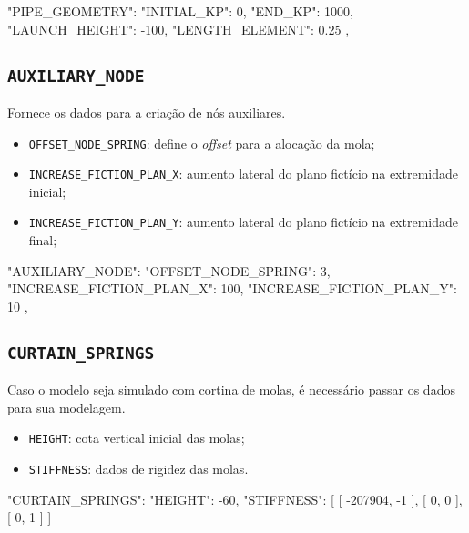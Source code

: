 \begin{jsoncode}
{
  "PIPE_GEOMETRY": {
    "INITIAL_KP": 0,
    "END_KP": 1000,
    "LAUNCH_HEIGHT": -100,
    "LENGTH_ELEMENT": 0.25
  },
}
\end{jsoncode}

\subsection{\texttt{AUXILIARY\_NODE}}

Fornece os dados para a criação de nós auxiliares.

\begin{itemize}
  \item \texttt{OFFSET\_NODE\_SPRING}: define o \textit{offset} para a alocação da mola;
  \item \texttt{INCREASE\_FICTION\_PLAN\_X}: aumento lateral do plano fictício na extremidade inicial;
  \item \texttt{INCREASE\_FICTION\_PLAN\_Y}: aumento lateral do plano fictício na extremidade final;
\end{itemize}

\begin{jsoncode}
{
  "AUXILIARY_NODE": {
    "OFFSET_NODE_SPRING": 3,
    "INCREASE_FICTION_PLAN_X": 100,
    "INCREASE_FICTION_PLAN_Y": 10
  },
}
\end{jsoncode}

\subsection{\texttt{CURTAIN\_SPRINGS}}

Caso o modelo seja simulado com cortina de molas, é necessário passar os dados para sua modelagem.

\begin{itemize}
  \item \texttt{HEIGHT}: cota vertical inicial das molas;
  \item \texttt{STIFFNESS}: dados de rigidez das molas.
\end{itemize}

\begin{jsoncode}
{
  "CURTAIN_SPRINGS": {
    "HEIGHT": -60,
    "STIFFNESS": [
      [
        -207904,
        -1
      ],
      [
        0,
        0
      ],
      [
        0,
        1
      ]
    ]
  }
}
\end{jsoncode}

